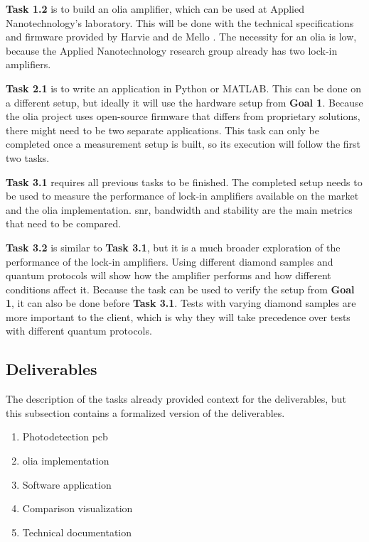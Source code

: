 \textbf{Task 1.2} is to build an \gls{olia} amplifier, which can be used at Applied Nanotechnology's laboratory. This will be done with the technical specifications and firmware provided by Harvie and de Mello \cite{harvie2023olia}. The necessity for an \gls{olia} is low, because the Applied Nanotechnology research group already has two lock-in amplifiers.

\textbf{Task 2.1} is to write an application in Python or MATLAB. This can be done on a different setup, but ideally it will use the hardware setup from \textbf{Goal 1}. Because the \gls{olia} project uses open-source firmware that differs from proprietary solutions, there might need to be two separate applications. This task can only be completed once a measurement setup is built, so its execution will follow the first two tasks.

\textbf{Task 3.1} requires all previous tasks to be finished. The completed setup needs to be used to measure the performance of lock-in amplifiers available on the market and the \gls{olia} implementation. \gls{snr}, bandwidth and stability are the main metrics that need to be compared.

\textbf{Task 3.2} is similar to \textbf{Task 3.1}, but it is a much broader exploration of the performance of the lock-in amplifiers. Using different diamond samples and quantum protocols will show how the amplifier performs and how different conditions affect it. Because the task can be used to verify the setup from \textbf{Goal 1}, it can also be done before \textbf{Task 3.1}. Tests with varying diamond samples are more important to the client, which is why they will take precedence over tests with different quantum protocols.


\subsection{Deliverables}
The description of the tasks already provided context for the deliverables, but this subsection contains a formalized version of the deliverables.

\begin{enumerate}
	\item Photodetection \gls{pcb} 
	\item \gls{olia} implementation
	\item Software application
	\item Comparison visualization
	\item Technical documentation
\end{enumerate}

